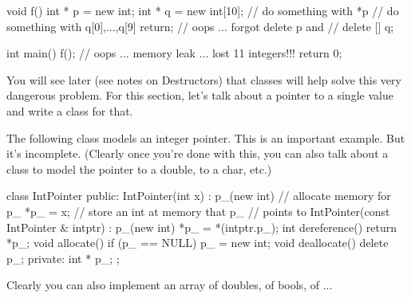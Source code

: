 \begin{consolethree}[escapeinside=||]
void f()
{
    int * p = new int;
    int * q = new int[10];
    // do something with *p
    // do something with q[0],...,q[9]
    return; // oops ... forgot delete p and
            // delete [] q;
}

int main()
{
    f();
    // oops ... memory leak ... lost 11 integers!!!
    return 0;
}
\end{consolethree}

You will see later (see notes on Destructors) that classes will help
solve this very dangerous problem. For this section,
let's talk about a pointer to a single value and write a
class for that.

The following class models an integer pointer. This is an important
example. But it's incomplete. (Clearly once
you're done with this, you can also talk about a class
to model the pointer to a double, to a char, etc.)

\begin{consolethree}[escapeinside=||]
class IntPointer
{
public:
    IntPointer(int x)
        : p_(new int) // allocate memory for p_
    {
        *p_ = x;      // store an int at memory that p_
                      // points to
    }
    IntPointer(const IntPointer & intptr)
        : p_(new int)
    {
        *p_ = *(intptr.p_);
    }
    int dereference()
    {
        return *p_;
    }
    void allocate()
    {
        if (p_ == NULL)
        {
            p_ = new int;
        }
    }
    void deallocate()
    {
        delete p_;
    }
private:
    int * p_;
};
\end{consolethree}








\newpage{}







Clearly you can also implement an array of doubles, of bools, of ...


